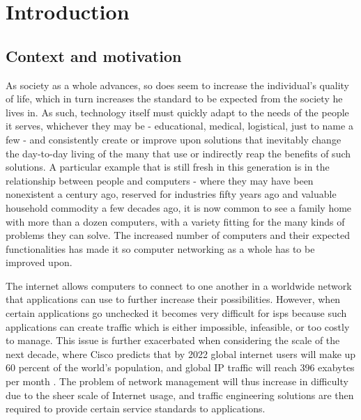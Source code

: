 \chapter{Introduction}

\section{Context and motivation}

    As society as a whole advances, so does seem to increase the individual's quality of life, which in turn increases the standard to be expected from the society he lives in.
    As such, technology itself must quickly adapt to the needs of the people it serves, whichever they may be - educational, medical, logistical, just to name a few - and consistently create or improve upon solutions that inevitably change the day-to-day living of the many that use or indirectly reap the benefits of such solutions.
    A particular example that is still fresh in this generation is in the relationship between people and computers - where they may have been nonexistent a century ago, reserved for industries fifty years ago and valuable household commodity a few decades ago, it is now common to see a family home with more than a dozen computers, with a variety fitting for the many kinds of problems they can solve.
    The increased number of computers and their expected functionalities has made it so computer networking as a whole has to be improved upon.

    The internet allows computers to connect to one another in a worldwide network that applications can use to further increase their possibilities.
    However, when certain applications go unchecked it becomes very difficult for \glspl{isp} because such applications can create traffic which is either impossible, infeasible, or too costly to manage.
    This issue is further exacerbated when considering the scale of the next decade, where Cisco predicts that by 2022 global internet users will make up 60 percent of the world's population, and global IP traffic will reach 396 exabytes per month \cite{cisco2019}.
    The problem of network management will thus increase in difficulty due to the sheer scale of Internet usage, and traffic engineering solutions are then required to provide certain service standards to applications.

